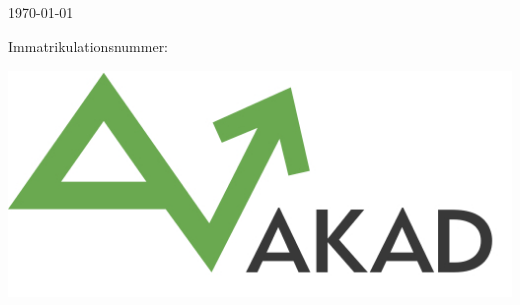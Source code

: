 \documentclass[a4paper,12pt]{article}
\newif\iflistoffigures
\newif\iflistoftables
\newif\ifacronym
\newif\iflistofformeln
\begin{document}
\begin{center}
\thispagestyle{empty}
\vspace{9cm}

\Huge{\Titel}
\vspace{1cm}
\onehalfspacing

\Large{\Betreff}

\vspace{1cm}
\Large{\Betreuer \\}
\normalsize
\vspace{2cm}

\Name \\ \Strasse \\ \PlzOrt
\\
\vspace{2cm}

\today

Immatrikulationsnummer: \Immatrikulationsnummer

\href{mailto:\Email}{\Email}
\vspace{3cm}

\includegraphics[scale=0.35]{akad_logo.png}

\end{center}

\clearpage

\normalsize


\begin{spacing}{1.0} %
\newpage

\tableofcontents 
\newpage

\iflistoffigures
\listoffigures 
\newpage
\fi

\iflistoftables
\listoftables 
\newpage
\fi

\ifacronym

\fi

\iflistofformeln
\listof{Formel}{Formelübersicht}
\newpage
\fi


\end{spacing} 
\end{document}
